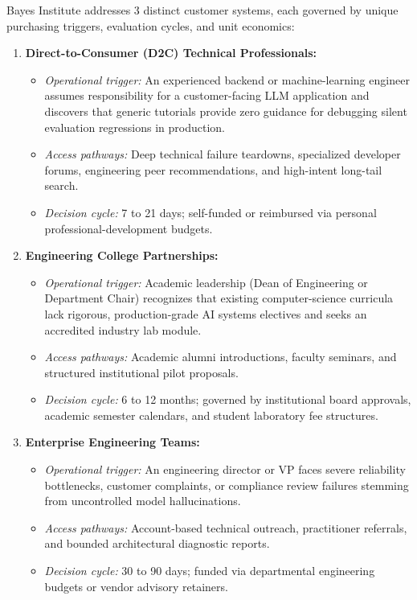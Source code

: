 Bayes Institute addresses 3 distinct customer systems, each governed by unique purchasing triggers, evaluation cycles, and unit economics:
\begin{enumerate}[leftmargin=*,itemsep=1pt]
  \item \textbf{Direct-to-Consumer (D2C) Technical Professionals:}
  \begin{itemize}[leftmargin=*,itemsep=1pt]
    \item \textit{Operational trigger:} An experienced backend or machine-learning engineer assumes responsibility for a customer-facing LLM application and discovers that generic tutorials provide zero guidance for debugging silent evaluation regressions in production.
    \item \textit{Access pathways:} Deep technical failure teardowns, specialized developer forums, engineering peer recommendations, and high-intent long-tail search.
    \item \textit{Decision cycle:} 7 to 21 days; self-funded or reimbursed via personal professional-development budgets.
  \end{itemize}
  \item \textbf{Engineering College Partnerships:}
  \begin{itemize}[leftmargin=*,itemsep=1pt]
    \item \textit{Operational trigger:} Academic leadership (Dean of Engineering or Department Chair) recognizes that existing computer-science curricula lack rigorous, production-grade AI systems electives and seeks an accredited industry lab module.
    \item \textit{Access pathways:} Academic alumni introductions, faculty seminars, and structured institutional pilot proposals.
    \item \textit{Decision cycle:} 6 to 12 months; governed by institutional board approvals, academic semester calendars, and student laboratory fee structures.
  \end{itemize}
  \item \textbf{Enterprise Engineering Teams:}
  \begin{itemize}[leftmargin=*,itemsep=1pt]
    \item \textit{Operational trigger:} An engineering director or VP faces severe reliability bottlenecks, customer complaints, or compliance review failures stemming from uncontrolled model hallucinations.
    \item \textit{Access pathways:} Account-based technical outreach, practitioner referrals, and bounded architectural diagnostic reports.
    \item \textit{Decision cycle:} 30 to 90 days; funded via departmental engineering budgets or vendor advisory retainers.
  \end{itemize}
\end{enumerate}

